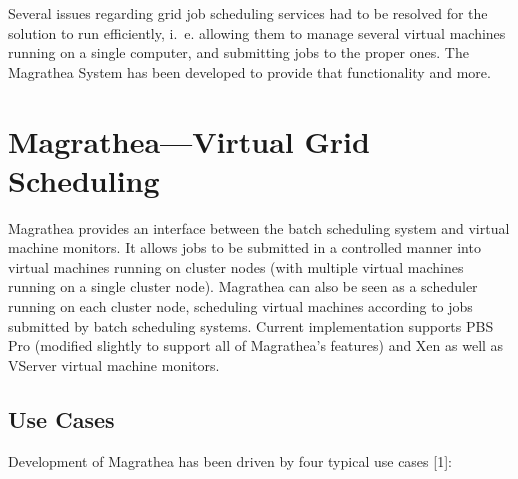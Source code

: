 \documentclass{article}
\begin{document}
Several issues regarding grid job scheduling services had to be resolved for the solution to run efficiently, i. e. allowing them to manage several virtual machines running on a single computer, and submitting jobs to the proper ones. The Magrathea System has been developed to provide that functionality and more.

\section{Magrathea---Virtual Grid Scheduling}
Magrathea provides an interface between the batch scheduling system and virtual machine monitors. It allows jobs to be submitted in a controlled manner into virtual machines running on cluster nodes (with multiple virtual machines running on a single cluster node). Magrathea can also be seen as a scheduler running on each cluster node, scheduling virtual machines according to jobs submitted by batch scheduling systems. Current implementation supports PBS Pro (modified slightly to support all of Magrathea's features) and Xen as well as VServer virtual machine monitors.

\subsection{Use Cases}
Development of Magrathea has been driven by four typical use cases [1]:

\medskip
\end{document}
